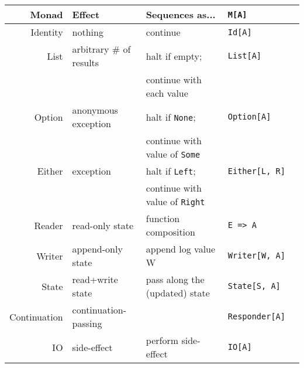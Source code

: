 \documentclass{tufte-handout}
\begin{document}
\begin{table}[ht]
  \centering
  \selectfont
  \begin{tabular}{rllll}
    \toprule
    Monad        & Effect\footnotemark[1]  & Sequences as...                & \texttt{M[A]} \\ 
    \midrule
    Identity     & nothing                 & continue                       & \texttt{Id[A]} \\
    List         & arbitrary \# of results & halt if empty;                 & \texttt{List[A]} \\
                 &                         & continue with each value       & \\
    Option       & anonymous exception     & halt if \texttt{None};         & \texttt{Option[A]} \\
                 &                         & continue with value of \texttt{Some} & \\
    Either       & exception               & halt if \texttt{Left};         & \texttt{Either[L, R]} \\
                 &                         & continue with value of \texttt{Right} & \\
    Reader       & read-only state         & function composition           & \texttt{E => A} \\
    Writer       & append-only state       & append log value W             & \texttt{Writer[W, A]} \\
    State        & read+write state        & pass along the (updated) state & \texttt{State[S, A]} \\
    Continuation & continuation-passing    &                                & \texttt{Responder[A]} \\
    IO           & side-effect\footnotemark[2] & perform side-effect        & \texttt{IO[A]} \\
    \bottomrule
  \end{tabular}
  \label{tab:normaltab}
\end{table}





\end{document}

